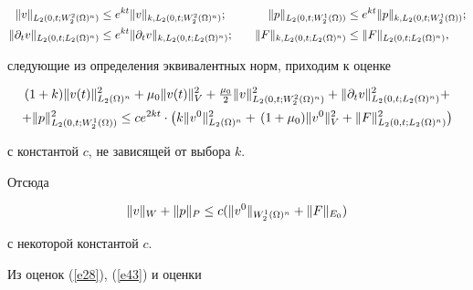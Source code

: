 \begin{pf}
\begin{alignat*}{2}


\|v\|_{L_2(0,t;W_2^2(\Om)^n)}&\le 


e^{kt}\|v\|_{k,L_2(0,t;W_2^2(\Om)^n)}; & \quad


\|p\|_{L_2(0,t;W_2^1(\Om))}& \le 


e^{kt}\|p\|_{k,L_2(0,t;W_2^1(\Om))};\\


%


\|\partial_t v\|_{L_2(0,t;L_2(\Om)^n)}& \le 


e^{kt}\|\partial_t v\|_{k,L_2(0,t;L_2(\Om)^n)}; & \quad


\|F\|_{k,L_2(0,t;L_2(\Om)^n)}& \le 


\|F\|_{L_2(0,t;L_2(\Om)^n)},


\end{alignat*}


следующие из определения эквивалентных норм, приходим к оценке


\begin{multline}


\label{e45} (1+k) \|v(t)\|_{L_2(\Om)^n}^2 +\mu_0 \|v(t)\|_V^2 +


\tfrac{\mu_0}{2}\|v\|_{L_2(0,t;W_2^2(\Om)^n)}^2 +


\|\partial_t v\|_{L_2(0,t;L_2(\Om)^n)}^2 +\\


%


+\|p\|_{L_2(0,t;W_2^1(\Om))}^2 \le  c e^{2kt}\cdot


\big(k\|v^0\|_{L_2(\Om)^n}^2+\,(1+\mu_0) \|v^0\|_V^2+


\|F\|_{L_2(0,t;L_2(\Om)^n)}^2 \big)


\end{multline}


с константой $c$, не зависящей от выбора $k$.





Отсюда


\begin{equation}\label{e46}


\|v\|_W+\|p\|_P \le c(\|v^0\|_{W^1_2(\Om)^n}+\|F\|_{E_0})


\end{equation}


с некоторой константой $c$.





Из оценок (\ref{e28}), (\ref{e43}) и оценки



\end{pf}
